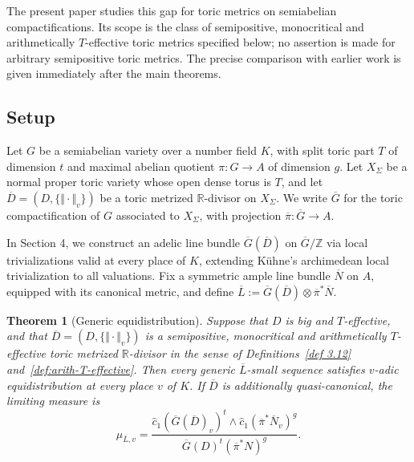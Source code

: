 \documentclass[10pt,a4paper]{amsart}
\theoremstyle{plain}
\theoremstyle{plain}
\newtheorem{thm}{Theorem}[section] \newtheorem{cor}[thm]{Corollary}
\numberwithin{equation}{section}
\begin{document}
The present paper studies this gap for toric metrics on semiabelian
compactifications.  Its scope is the class of semipositive, monocritical and
arithmetically \(T\)-effective toric metrics specified below; no assertion is
made for arbitrary semipositive toric metrics.  The precise comparison with
earlier work is given immediately after the main theorems.

\subsection*{Setup}



Let \(G\) be a semiabelian variety over a number field \(K\), with split toric
part \(T\) of dimension \(t\) and maximal abelian quotient
\(\pi:G\to A\) of dimension \(g\).  Let \(X_{\Sigma}\) be a normal proper
toric variety whose open dense torus is \(T\), and let
\(\overline{D}=(D,\{\Vert\cdot\Vert_v\})\) be a toric metrized
\(\mathbb R\)-divisor on \(X_{\Sigma}\).  We write \(\overline G\) for the
toric compactification of \(G\) associated to \(X_{\Sigma}\), with projection
\(\overline\pi:\overline G\to A\).


In Section 4, we construct an adelic line bundle \(\overline G(\overline D)\)
on \(\overline G/\mathbb Z\) via local trivializations valid at every place of
\(K\), extending K\"uhne's archimedean local trivialization to all valuations.
Fix a symmetric ample line bundle \(\overline N\) on \(A\), equipped with its
canonical metric, and define
$\overline{L}:=\overline{G}(\overline{D})\otimes \overline{\pi}^*\overline{N}$.
\begin{thm}[Generic equidistribution]\label{thm:intro-generic-equidistribution}
	Suppose that \(D\) is big and \(T\)-effective, and that
	\(\overline D=(D,\{\Vert\cdot\Vert_v\})\) is a semipositive, monocritical and
	arithmetically \(T\)-effective toric metrized \(\mathbb R\)-divisor in the
	sense of Definitions~\ref{def 3.12} and~\ref{def:arith-T-effective}.  Then
	every generic \(\overline L\)-small sequence satisfies \(v\)-adic
	equidistribution at every place \(v\) of \(K\).  If \(\overline D\) is
	additionally quasi-canonical, the limiting measure is
	\[
	\mu_{\overline{L},v}
	=
	\frac{
		\hat{c}_1(\overline{G}(\overline{D})_v)^t
		\wedge
		\hat{c}_1(\overline{\pi}^*\overline{N}_v)^g
	}{
		\overline{G}(D)^t(\overline{\pi}^*N)^g
	}.
	\]
\end{thm}
\end{document}
